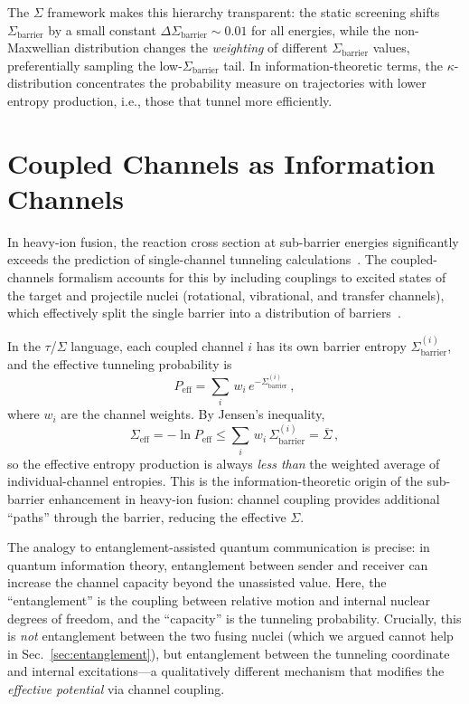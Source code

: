 \documentclass[prc,twocolumn,superscriptaddress,longbibliography,floatfix]{revtex4-2}
\newcommand{\tauasym}{\tau}
\newcommand{\Sbar}{\Sigma_{\mathrm{barrier}}}
\begin{document}
The $\Sigma$ framework makes this hierarchy transparent: the static
screening shifts $\Sbar$ by a small constant $\Delta\Sbar \sim 0.01$
for all energies, while the non-Maxwellian distribution changes the
\emph{weighting} of different $\Sbar$ values, preferentially sampling
the low-$\Sbar$ tail.  In information-theoretic terms, the
$\kappa$-distribution concentrates the probability measure
on trajectories with lower entropy production, i.e., those that
tunnel more efficiently.

\section{Coupled Channels as Information Channels}
\label{sec:coupled}

In heavy-ion fusion, the reaction cross section at sub-barrier
energies significantly exceeds the prediction of single-channel
tunneling calculations~\cite{Balantekin1998}.  The coupled-channels
formalism accounts for this by including couplings to excited states
of the target and projectile nuclei (rotational, vibrational, and
transfer channels), which effectively split the single barrier into a
distribution of barriers~\cite{Rowley1991,Dasgupta1998}.

In the $\tauasym$/$\Sigma$ language, each coupled channel $i$ has its
own barrier entropy $\Sbar^{(i)}$, and the effective tunneling
probability is
\begin{equation}
P_{\mathrm{eff}} = \sum_{i}\,w_{i}\,e^{-\Sbar^{(i)}}\,,
\label{eq:cc_tunnel}
\end{equation}
where $w_{i}$ are the channel weights.  By Jensen's inequality,
\begin{equation}
\Sigma_{\mathrm{eff}} = -\ln P_{\mathrm{eff}}
\leq \sum_{i}\,w_{i}\,\Sbar^{(i)} = \overline{\Sigma}\,,
\label{eq:cc_jensen}
\end{equation}
so the effective entropy production is always \emph{less than} the
weighted average of individual-channel entropies.  This is the
information-theoretic origin of the sub-barrier enhancement in
heavy-ion fusion: channel coupling provides additional
``paths'' through the barrier, reducing the effective $\Sigma$.

The analogy to entanglement-assisted quantum communication is
precise: in quantum information theory, entanglement between sender
and receiver can increase the channel capacity beyond the unassisted
value.  Here, the ``entanglement'' is the coupling between relative
motion and internal nuclear degrees of freedom, and the ``capacity''
is the tunneling probability.  Crucially, this is \emph{not}
entanglement between the two fusing nuclei (which we argued cannot
help in Sec.~\ref{sec:entanglement}), but entanglement between
the tunneling coordinate and internal excitations---a qualitatively
different mechanism that modifies the \emph{effective potential}
via channel coupling.
\end{document}
